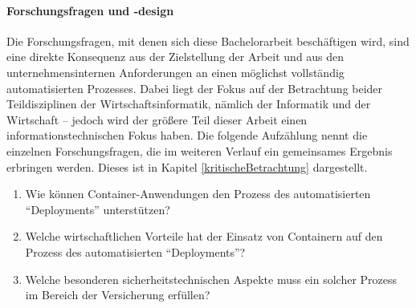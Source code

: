 \paragraph{Forschungsfragen und -design}\label{ffs}
Die Forschungsfragen, mit denen sich diese Bachelorarbeit beschäftigen wird, sind eine direkte Konsequenz aus der Zielstellung der Arbeit und aus den unternehmensinternen Anforderungen an einen möglichst vollständig automatisierten Prozesses. Dabei liegt der Fokus auf der Betrachtung beider Teildisziplinen der Wirtschaftsinformatik, nämlich der Informatik und der Wirtschaft -- jedoch wird der größere Teil dieser Arbeit einen informationstechnischen Fokus haben. Die folgende Aufzählung nennt die einzelnen Forschungsfragen, die im weiteren Verlauf ein gemeinsames Ergebnis erbringen werden. Dieses ist in Kapitel \vref{kritischeBetrachtung} dargestellt.
\begin{enumerate}
	\item Wie können Container-Anwendungen den Prozess des automatisierten \enquote{Deployments} unterstützen?
	\item Welche wirtschaftlichen Vorteile hat der Einsatz von Containern auf den Prozess des automatisierten \enquote{Deployments}?
	\item Welche besonderen sicherheitstechnischen Aspekte muss ein solcher Prozess im Bereich der Versicherung erfüllen?
\end{enumerate}

